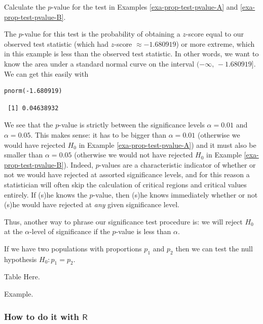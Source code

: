 \documentclass[captions=tableheading]{scrbook}
\begin{document}
\begin{example}
Calculate the \(p\)-value for the test in Examples \ref{exa-prop-test-pvalue-A} and \ref{exa-prop-test-pvalue-B}.

The \(p\)-value for this test is the probability of obtaining a \(z\)-score equal to our observed test statistic (which had \(z\)-score \(\approx-1.680919\)) or more extreme, which in this example is less than the observed test statistic. In other words, we want to know the area under a standard normal curve on the interval \((-\infty,\,-1.680919]\). We can get this easily with
\end{example}


\begin{verbatim}
pnorm(-1.680919)
\end{verbatim}

\begin{verbatim}
 [1] 0.04638932
\end{verbatim}

We see that the \(p\)-value is strictly between the significance levels \(\alpha=0.01\) and \(\alpha=0.05\). This makes sense: it has to be bigger than \(\alpha=0.01\) (otherwise we would have rejected \(H_{0}\) in Example \ref{exa-prop-test-pvalue-A}) and it must also be smaller than \(\alpha=0.05\) (otherwise we would not have rejected \(H_{0}\) in Example \ref{exa-prop-test-pvalue-B}). Indeed, \(p\)-values are a characteristic indicator of whether or not we would have rejected at assorted significance levels, and for this reason a statistician will often skip the calculation of critical regions and critical values entirely. If (s)he knows the \(p\)-value, then (s)he knows immediately whether or not (s)he would have rejected at \emph{any} given significance level.

Thus, another way to phrase our significance test procedure is: we will reject \(H_{0}\) at the \(\alpha\)-level of significance if the \(p\)-value is less than \(\alpha\).

\begin{rem}
If we have two populations with proportions \(p_{1}\) and \(p_{2}\) then we can test the null hypothesis \(H_{0}:p_{1}=p_{2}\).
\end{rem}

Table Here.

\begin{example}
Example.
\end{example}
\subsubsection{How to do it with \(\mathsf{R}\)}
\label{sec-10-2-1-1}
\end{document}
